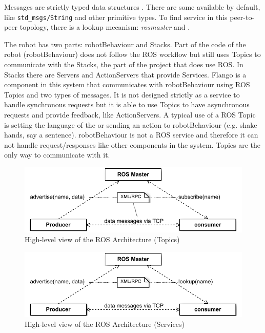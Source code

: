 Messages are strictly typed data structures . There are some available by default, like \texttt{std\_msgs/String} and other primitive types.
To find service in this peer-to-peer topology, there is a lookup mecanism: \emph{rosmaster}  and .

The robot has two parts: robotBehaviour and Stacks.
Part of the code of the robot (robotBehaviour) does not follow the \ac{ROS} workflow but still uses Topics to communicate with the Stacks, the part of the project that does use \ac{ROS}.
In Stacks there are Servers and ActionServers that provide Services.
Flango \cm is a component in this system that communicates with robotBehaviour using \ac{ROS} Topics and two types of messages.
It is not designed strictly as a service to handle synchronous requests but it is able to use Topics to have asynchronous requests and provide feedback, like ActionServers.
A typical use of a \ac{ROS} Topic is setting the language of the \cm or sending an action to robotBehaviour (e.g. shake hands, say a sentence).
robotBehaviour is not a \ac{ROS} service and therefore it can not handle request/responses like other components in the system.
Topics are the only way to communicate with it.

\begin{figure}[htb]
    \centering
    \includegraphics{figures/design/ros-architecture-topics.pdf}
    \caption{High-level view of the ROS Architecture (Topics)}
    \label{fig:design-ros-topics}
\end{figure}

\begin{figure}[htb]
    \centering
    \includegraphics{figures/design/ros-architecture-services.pdf}
    \caption{High-level view of the ROS Architecture (Services)}
    \label{fig:design-ros-services}
\end{figure}

